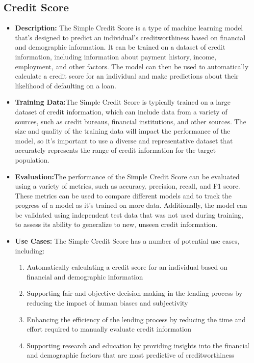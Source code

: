 \subsection{Credit Score}

\begin{itemize}
    \item \textbf{Description:} The Simple Credit Score is a type of machine learning model that's designed to predict an individual's creditworthiness based on financial and demographic information. It can be trained on a dataset of credit information, including information about payment history, income, employment, and other factors. The model can then be used to automatically calculate a credit score for an individual and make predictions about their likelihood of defaulting on a loan.
    \item \textbf{Training Data:}The Simple Credit Score is typically trained on a large dataset of credit information, which can include data from a variety of sources, such as credit bureaus, financial institutions, and other sources. The size and quality of the training data will impact the performance of the model, so it's important to use a diverse and representative dataset that accurately represents the range of credit information for the target population.
    \item \textbf{Evaluation:}The performance of the Simple Credit Score can be evaluated using a variety of metrics, such as accuracy, precision, recall, and F1 score. These metrics can be used to compare different models and to track the progress of a model as it's trained on more data. Additionally, the model can be validated using independent test data that was not used during training, to assess its ability to generalize to new, unseen credit information.
    \item \textbf{Use Cases:} The Simple Credit Score has a number of potential use cases, including:
        \begin{enumerate}  
            \item Automatically calculating a credit score for an individual based on financial and demographic information
            \item Supporting fair and objective decision-making in the lending process by reducing the impact of human biases and subjectivity
            \item Enhancing the efficiency of the lending process by reducing the time and effort required to manually evaluate credit information
            \item Supporting research and education by providing insights into the financial and demographic factors that are most predictive of creditworthiness

\end{enumerate}
\end{itemize}
